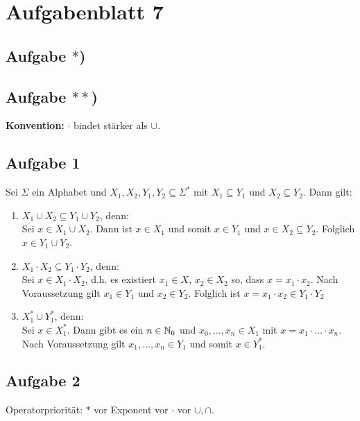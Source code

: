 
\section{Aufgabenblatt 7}

\subsection*{Aufgabe $\ast$)}

\subsection*{Aufgabe $\ast\ast$)}

\textbf{Konvention:} $\cdot$ bindet stärker als $\cup$.

\subsection{Aufgabe 1}
Sei $\Sigma$ ein Alphabet und $X_1,X_2,Y_1,Y_2\subseteq\Sigma^\ast$ mit $X_1\subseteq Y_1$ und $X_2\subseteq Y_2$. Dann gilt:
\begin{enumerate}
	\item $X_1\cup X_2\subseteq Y_1\cup Y_2$, denn:\\
	Sei $x\in X_1\cup X_2$. 
	Dann ist $x\in X_1$ und somit $x\in Y_1$ und $x\in X_2\subseteq Y_2$. Folglich $x\in Y_1\cup Y_2$.
	\item $X_1\cdot X_2\subseteq Y_1\cdot Y_2$, denn:\\
	Sei $x\in X_1\cdot X_2$, d.h. es existiert $x_1\in X$, $x_2\in X_2$ so, dass $x=x_1\cdot x_2$. 
	Nach Voraussetzung gilt $x_1\in Y_1$ und $x_2\in Y_2$. 
	Folglich ist $x=x_1\cdot x_2\in Y_1\cdot Y_2$
	\item $X_1^\ast\cup Y_1^\ast$, denn:\\
	Sei $x\in X_1^\ast$. 
	Dann gibt es ein $n\in\mathbb{N}_0$ und $x_0,\ldots, x_n\in X_1$ mit $x=x_1\cdot\ldots\cdot x_n$. 
	Nach Voraussetzung gilt $x_1,\ldots,x_n\in Y_1$ und somit $x\in Y_1^\ast$.
\end{enumerate}

\subsection{Aufgabe 2}
Operatorpriorität: $\ast$ vor Exponent vor $\cdot$ vor $\cup,\cap$.

